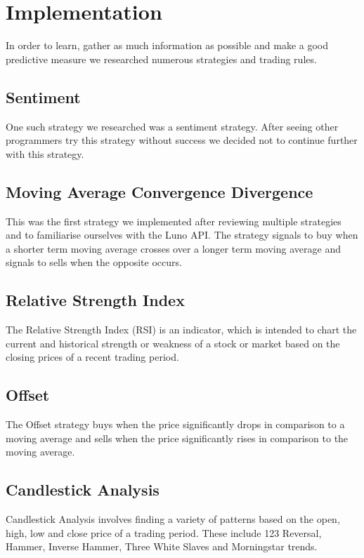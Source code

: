 \documentclass[a4paper12pt, twocolumn]{article}
\begin{document}
\section{Implementation}
In order to learn, gather as much information as possible and make a good predictive measure we researched numerous strategies and trading rules. 
\subsection{Sentiment}
One such strategy we researched was a sentiment strategy. After seeing other programmers try this strategy without success we decided not to continue further with this strategy.
\subsection{Moving Average Convergence Divergence}
This was the first strategy we implemented after reviewing multiple strategies and to familiarise ourselves with the Luno API. The strategy signals to buy when a shorter term moving average crosses over a longer term moving average and signals to sells when the opposite occurs.
\subsection{Relative Strength Index}
The Relative Strength Index (RSI) is an indicator, which is intended to chart the current and historical strength or weakness of a stock or market based on the closing prices of a recent trading period.
\subsection{Offset}
The Offset strategy buys when the price  significantly drops in comparison to a moving average and sells when the price significantly rises in comparison to the moving average.
\subsection{Candlestick Analysis}
Candlestick Analysis involves finding a variety of patterns based on the open, high, low and close price of a trading period. These include 123 Reversal, Hammer, Inverse Hammer, Three White Slaves and Morningstar trends.
\end{document}
